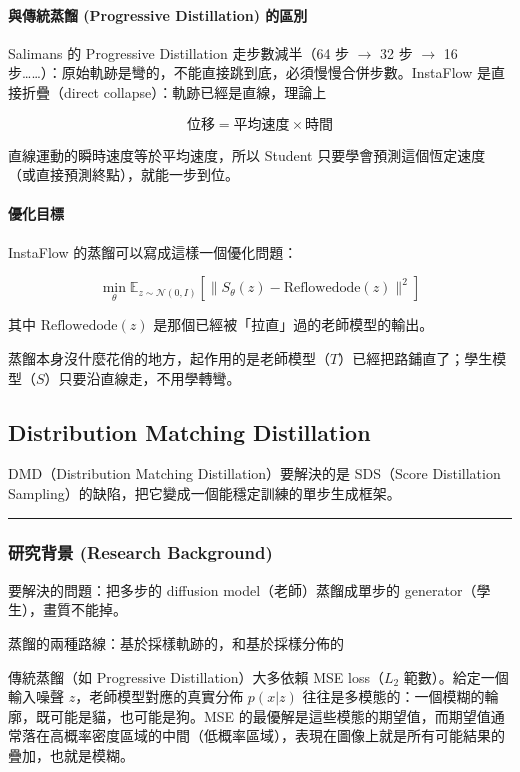 \paragraph{與傳統蒸餾 (Progressive Distillation) 的區別}

Salimans 的 Progressive Distillation 走步數減半（64 步 \(\to\) 32 步 \(\to\) 16 步……）：原始軌跡是彎的，不能直接跳到底，必須慢慢合併步數。InstaFlow 是直接折疊（direct collapse）：軌跡已經是直線，理論上

\[
\text{位移} = \text{平均速度} \times \text{時間}
\]

直線運動的瞬時速度等於平均速度，所以 Student 只要學會預測這個恆定速度（或直接預測終點），就能一步到位。

\paragraph{優化目標}

InstaFlow 的蒸餾可以寫成這樣一個優化問題：

\[
\min_\theta \mathbb{E}_{z \sim \mathcal{N}(0, I)} \left[ \| S_\theta(z) - \text{Reflowedode}(z) \|^2 \right]
\]

其中 \(\text{Reflowedode}(z)\) 是那個已經被「拉直」過的老師模型的輸出。

蒸餾本身沒什麼花俏的地方，起作用的是老師模型（\(T\)）已經把路鋪直了；學生模型（\(S\)）只要沿直線走，不用學轉彎。

\subsection{Distribution Matching Distillation}

DMD（Distribution Matching Distillation）要解決的是 SDS（Score Distillation Sampling）的缺陷，把它變成一個能穩定訓練的單步生成框架。

\hrule

\subsubsection{研究背景 (Research Background)}

要解決的問題：把多步的 diffusion model（老師）蒸餾成單步的 generator（學生），畫質不能掉。

\colorbox{mdc3}{\textcolor{mdc1}{蒸餾的兩種路線：基於採樣軌跡的，和基於採樣分佈的}}

傳統蒸餾（如 Progressive Distillation）大多依賴 MSE loss（\(L_2\) 範數）。給定一個輸入噪聲 \(z\)，老師模型對應的真實分佈 \(p(x|z)\) 往往是多模態的：一個模糊的輪廓，既可能是貓，也可能是狗。MSE 的最優解是這些模態的期望值，而期望值通常落在高概率密度區域的中間（低概率區域），表現在圖像上就是所有可能結果的疊加，也就是模糊。

